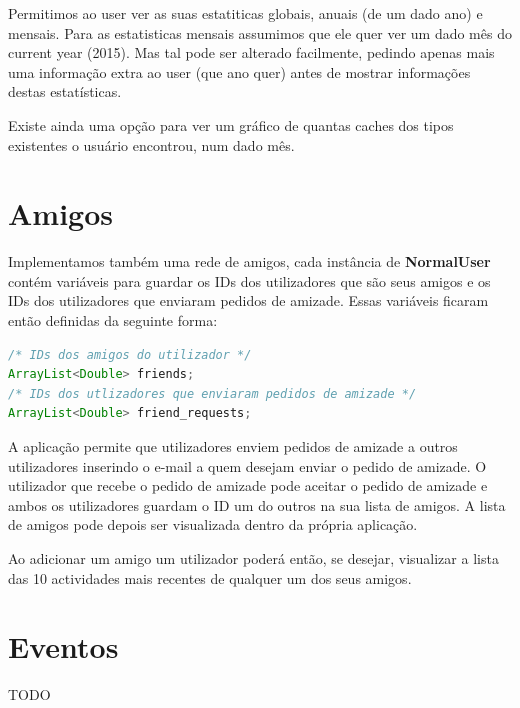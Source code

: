 \documentclass{article}
\begin{document}
\par Permitimos ao user ver as suas estatiticas globais, anuais (de um dado ano) e mensais. Para as estatisticas mensais assumimos que ele quer ver um dado mês do current year (2015). Mas tal pode ser alterado facilmente, pedindo apenas mais uma informação extra ao user (que ano quer) antes de mostrar informações destas estatísticas.

\par Existe ainda uma opção para ver um gráfico de quantas caches dos tipos existentes o usuário encontrou, num dado mês.




\pagebreak
\section{Amigos}
\par Implementamos também uma rede de amigos, cada instância de \textbf{NormalUser} contém variáveis para guardar
os IDs dos utilizadores que são seus amigos e os IDs dos utilizadores que enviaram pedidos de amizade.
Essas variáveis ficaram então definidas da seguinte forma:
\begin{lstlisting}[language=Java]
/* IDs dos amigos do utilizador */
ArrayList<Double> friends;
/* IDs dos utlizadores que enviaram pedidos de amizade */
ArrayList<Double> friend_requests;
\end{lstlisting}
\par A aplicação permite que utilizadores enviem pedidos de amizade a outros utilizadores inserindo o e-mail a quem desejam
enviar o pedido de amizade. O utilizador que recebe o pedido de amizade pode aceitar o pedido de amizade e ambos os
utilizadores guardam o ID um do outros na sua lista de amigos. A lista de amigos pode depois ser visualizada dentro da
própria aplicação.
\par Ao adicionar um amigo um utilizador poderá então, se desejar, visualizar a lista das 10 actividades mais recentes de qualquer um dos seus amigos.

\pagebreak
\section{Eventos}
TODO










\pagebreak
\end{document}
